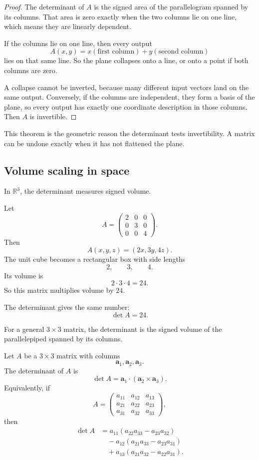 \begin{proof}
The determinant of \(A\) is the signed area of the parallelogram spanned by its columns.
That area is zero exactly when the two columns lie on one line, which means they are
linearly dependent.

If the columns lie on one line, then every output
\[
    A(x,y)=x(\text{first column})+y(\text{second column})
\]
lies on that same line.  So the plane collapses onto a line, or onto a point if both columns
are zero.

A collapse cannot be inverted, because many different input vectors land on the same
output.  Conversely, if the columns are independent, they form a basis of the plane, so
every output has exactly one coordinate description in those columns.  Then \(A\) is
invertible.
\end{proof}

This theorem is the geometric reason the determinant tests invertibility.  A matrix can
be undone exactly when it has not flattened the plane.

\subsection{Volume scaling in space}

In \(\mathbb R^3\), the determinant measures signed volume.

Let
\[
    A=
    \begin{pmatrix}
        2&0&0\\
        0&3&0\\
        0&0&4
    \end{pmatrix}.
\]
Then
\[
    A(x,y,z)=(2x,3y,4z).
\]
The unit cube becomes a rectangular box with side lengths
\[
    2,\qquad 3,\qquad 4.
\]
Its volume is
\[
    2\cdot3\cdot4=24.
\]
So this matrix multiplies volume by \(24\).

The determinant gives the same number:
\[
    \det A=24.
\]

For a general \(3\times3\) matrix, the determinant is the signed volume of the
parallelepiped spanned by its columns.

\begin{definition}
Let \(A\) be a \(3\times3\) matrix with columns
\[
    \mathbf a_1,\mathbf a_2,\mathbf a_3.
\]
The determinant of \(A\) is
\[
\boxed{
    \det A=\mathbf a_1\cdot(\mathbf a_2\times\mathbf a_3).
}
\]
Equivalently, if
\[
    A=
    \begin{pmatrix}
        a_{11}&a_{12}&a_{13}\\
        a_{21}&a_{22}&a_{23}\\
        a_{31}&a_{32}&a_{33}
    \end{pmatrix},
\]
then
\[
\boxed{
\begin{aligned}
\det A
&=
a_{11}(a_{22}a_{33}-a_{23}a_{32})\\
&\quad
-a_{12}(a_{21}a_{33}-a_{23}a_{31})\\
&\quad
+a_{13}(a_{21}a_{32}-a_{22}a_{31}).
\end{aligned}
}
\]
\end{definition}

